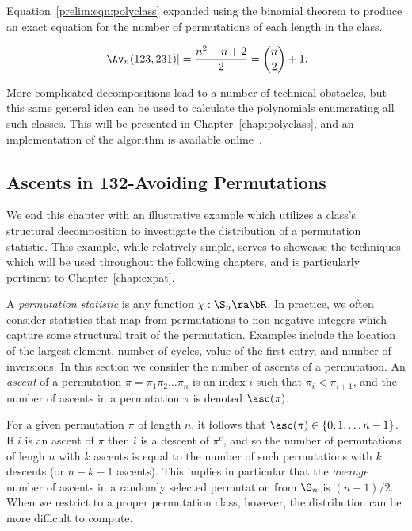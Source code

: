 \documentclass[12pt,twoside]{memoir}
\begin{document}
      Equation~\ref{prelim:eqn:polyclass} expanded using the binomial theorem to
      produce an exact equation for the number of permutations of each length in
      the class. 

      $$ | \Av_n (123, 231) | = \frac{n^2 - n + 2}{2} = \binom{n}{2} + 1.$$

      More complicated decompositions lead to a number of technical obstacles, but
      this same general idea can be used to calculate the polynomials enumerating all
      such classes. This will be presented in Chapter~\ref{chap:polyclass}, and
      an implementation of the algorithm is available
      online~\cite{polyclass-algo}. 

    \subsection{Ascents in 132-Avoiding Permutations}
    \label{prelim:sec:ascents-example}
    
      We end this chapter with an illustrative example which utilizes a class's
      structural decomposition to investigate the distribution of a permutation
      statistic. This example, while relatively simple, serves to showcase the
      techniques which will be used throughout the following chapters, and
      is particularly pertinent to Chapter~\ref{chap:expat}.
      
   
      A \emph{permutation statistic} is any function $\chi: \S_n \ra \bR$. In
      practice, we often consider statistics that map from permutations to
      non-negative integers which capture some structural trait of the
      permutation. Examples include the location of the largest element, number
      of cycles, value of the first entry, and number of inversions. In this
      section we consider the number of ascents of a permutation. An
      \emph{ascent} of a permutation $\pi = \pi_1 \pi_2 \dots \pi_n$ is an index
      $i$ such that $\pi_i < \pi_{i+1}$, and the number of ascents in a
      permutation $\pi$ is denoted $\asc(\pi)$. 


      For a given permutation $\pi$ of length $n$, it follows that $\asc(\pi) \in \{0, 1,
      \dots n-1\}$. If $i$ is an ascent of $\pi$ then $i$ is a descent of
      $\pi^c$, and so the number of permutations of lengh $n$ with $k$ ascents is equal to
      the number of such permutations with $k$ descents (or $n - k - 1$ ascents).
      This implies in particular that the \emph{average} number of ascents in a
      randomly selected permutation from $\S_n$ is $(n-1)/2$. When we restrict to a
      proper permutation class, however, the distribution can be more difficult
      to compute. 
\end{document}

